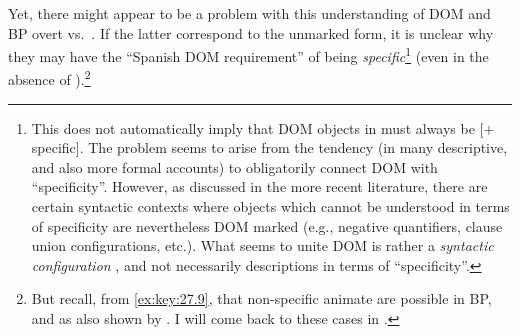 \documentclass[output=paper]{langsci/langscibook}
\begin{document}
Yet, there might appear to be a problem with this understanding of DOM and
\gls{BP} overt vs.\ . If the latter
correspond to the unmarked form, it is unclear why they may have the ``Spanish
DOM requirement'' of being \emph{specific}\footnote{This does not automatically
    imply that DOM objects in  must always be [$+$specific]. The problem
    seems to arise from the tendency (in many descriptive, and also more formal
    accounts) to obligatorily connect DOM with
    \enquote{specificity}. However, as
    discussed in the more recent literature, there are certain syntactic
    contexts where objects which cannot be understood in terms of specificity
    are nevertheless DOM marked (e.g., negative quantifiers, clause union
configurations, etc.). What seems to unite DOM
is rather a \emph{syntactic configuration} \parencite{Lopez2012}, and not
necessarily descriptions in terms of \enquote{specificity}.}  (even in the
absence of ).\footnote{But recall, from \eqref{ex:key:27.9}, that
    non-specific animate  are possible in
    \gls{BP}, and as also shown by
    \textcite{Cyrino1994,Cyrino1997}. I will come back to these cases in
.}
\end{document}
